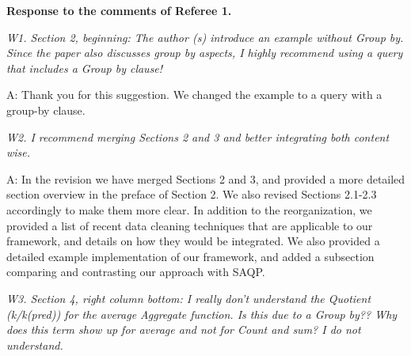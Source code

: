 


\vspace{1em}

{\noindent \bf Response to the comments of Referee 1.}

\vspace{1em}

\emph{W1. Section 2, beginning: The author (s) introduce an example without Group by. Since the paper also discusses group by aspects, I highly recommend using a query that includes a Group by clause!}

A: %
Thank you for this suggestion. We changed the example to a query with a group-by clause.


\mbox{}

\emph{W2. I recommend merging Sections 2 and 3 and better integrating both content wise.}

A: In the revision we have merged Sections 2 and 3, and provided a more detailed section overview in the preface of Section 2. We also revised Sections 2.1-2.3 accordingly to make them more clear.
In addition to the reorganization, we provided a list of recent data cleaning techniques that are applicable to our framework, and details on how they would be integrated.
We also provided a detailed example implementation of our framework, and added a subsection comparing and contrasting our approach with SAQP.


\mbox{}

\emph{W3. Section 4, right column bottom: I really don't understand the Quotient (k/k(pred)) for the average Aggregate function. Is this due to a Group by?? Why does this term show up for average and not for Count and sum? I do not understand.}

